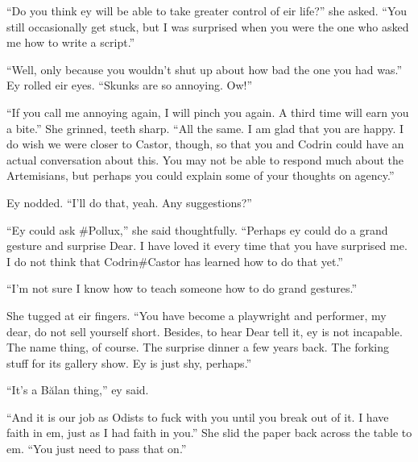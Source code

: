 ``Do you think ey will be able to take greater control of eir life?'' she asked. ``You still occasionally get stuck, but I was surprised when you were the one who asked me how to write a script.''

``Well, only because you wouldn't shut up about how bad the one you had was.'' Ey rolled eir eyes. ``Skunks are so annoying. Ow!''

``If you call me annoying again, I will pinch you again. A third time will earn you a bite.'' She grinned, teeth sharp. ``All the same. I am glad that you are happy. I do wish we were closer to Castor, though, so that you and Codrin could have an actual conversation about this. You may not be able to respond much about the Artemisians, but perhaps you could explain some of your thoughts on agency.''

Ey nodded. ``I'll do that, yeah. Any suggestions?''

``Ey could ask \#Pollux,'' she said thoughtfully. ``Perhaps ey could do a grand gesture and surprise Dear. I have loved it every time that you have surprised me. I do not think that Codrin\#Castor has learned how to do that yet.''

``I'm not sure I know how to teach someone how to do grand gestures.''

She tugged at eir fingers. ``You have become a playwright and performer, my dear, do not sell yourself short. Besides, to hear Dear tell it, ey is not incapable. The name thing, of course. The surprise dinner a few years back. The forking stuff for its gallery show. Ey is just shy, perhaps.''

``It's a Bălan thing,'' ey said.

``And it is our job as Odists to fuck with you until you break out of it. I have faith in em, just as I had faith in you.'' She slid the paper back across the table to em. ``You just need to pass that on.''
